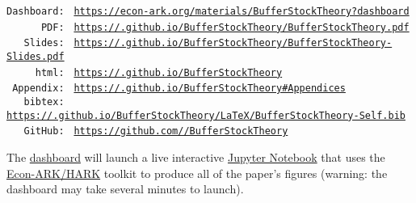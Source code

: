 \documentclass[BufferStockTheory]{subfiles}
\begin{document}
\hypertarget{links}{}
\begin{footnotesize}
  \parbox{\textwidth}{
    \begin{center}
      \begin{tabbing}
        \texttt{Dashboard:~} \= \= \texttt{\href{https://econ-ark.org/materials/BufferStockTheory?dashboard}{https://econ-ark.org/materials/BufferStockTheory?dashboard}} \\
        \texttt{~~~~~~PDF:~} \> \> \texttt{\href{https://\owner.github.io/BufferStockTheory/BufferStockTheory.pdf}{https://\owner.github.io/BufferStockTheory/BufferStockTheory.pdf}} \\ %
        \texttt{~~~Slides:~} \> \> \texttt{\href{https://\owner.github.io/BufferStockTheory/BufferStockTheory-Slides.pdf}{https://\owner.github.io/BufferStockTheory/BufferStockTheory-Slides.pdf}} \\
        \texttt{~~~~~html:~} \> \> \texttt{\href{https://\owner.github.io/BufferStockTheory}{https://\owner.github.io/BufferStockTheory}}    \\
        \texttt{~Appendix:~} \> \> \texttt{\href{https://\owner.github.io/BufferStockTheory\#Appendices}{https://\owner.github.io/BufferStockTheory\#Appendices}}    \\
        \texttt{~~~bibtex:~} \> \> \texttt{\href{https://\owner.github.io/BufferStockTheory/LaTeX/BufferStockTheory-Self.bib}{https://\owner.github.io/BufferStockTheory/LaTeX/BufferStockTheory-Self.bib}}  \\
        \texttt{~~~GitHub:~} \> \> \texttt{\href{https://github.com/\owner/BufferStockTheory}{https://github.com/\owner/BufferStockTheory}} \\
      \end{tabbing}
    \end{center}
    
    The \href{https://econ-ark.org/materials/BufferStockTheory?dashboard}{dashboard} will launch a live interactive \href{https://en.wikipedia.org/wiki/Project\_Jupyter\#Jupyter_Notebook}{Jupyter Notebook} that uses the \href{https://econ-ark/HARK}{Econ-ARK/HARK} toolkit to produce all of the paper's figures (warning: the dashboard may take several minutes to launch).
  } %
\end{footnotesize}

\begin{authorsinfo}
\end{authorsinfo}
\end{document}
